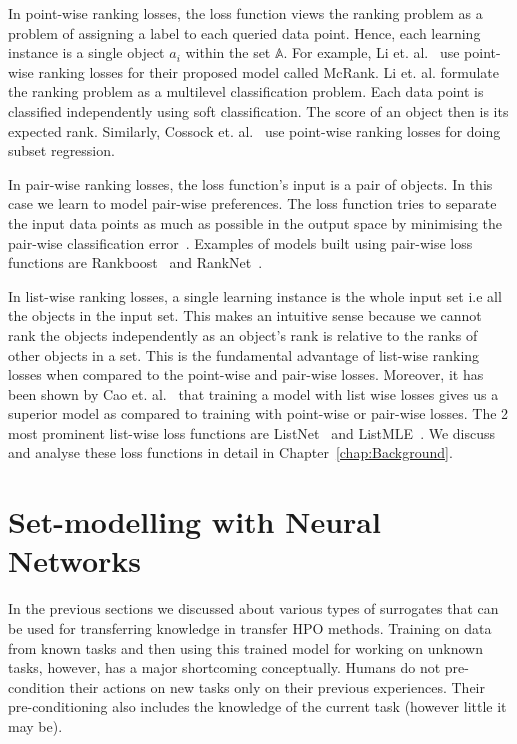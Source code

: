 \documentclass[12pt, twoside, ngerman]{report}
\begin{document}
In point-wise ranking losses,  the loss function views the ranking problem as a problem of assigning a label to each queried data point.
Hence,  each learning instance is a single object $a_i$ within the set $\mathbb{A}$.
For example,  Li et. al.~\cite{McRank} use point-wise ranking losses for their proposed model called McRank.
Li et.  al.  formulate the ranking problem as a multilevel classification problem.
Each data point is classified independently using soft classification.
The score of an object then is its expected rank.
Similarly,  Cossock et.  al.~\cite{subsetregressionpaper} use point-wise ranking losses for doing subset regression. 

In pair-wise ranking losses,  the loss function's input is a pair of objects.
In this case we learn to model pair-wise preferences.
The loss function tries to separate the input data points as much as possible in the output space by minimising the pair-wise classification error~\cite{pairwisepreferencespaper}.
Examples of models built using pair-wise loss functions are Rankboost~\cite{rankboostpaper} and RankNet~\cite{ranknetpaper}.

In list-wise ranking losses,  a single learning instance is the whole input set i.e all the objects in the input set.
This makes an intuitive sense because we cannot rank the objects independently as an object's rank is relative to the ranks of other objects in a set.
This is the fundamental advantage of list-wise ranking losses when compared to the point-wise and pair-wise losses.
Moreover,  it has been shown by Cao et. al.~\cite{listwisebetter} that training a model with list wise losses gives us a superior model as compared to training with point-wise or pair-wise losses.
The 2 most prominent list-wise loss functions are ListNet~\cite{listwisebetter} and ListMLE~\cite{listmlepaper}.
We discuss and analyse these loss functions in detail in Chapter~\ref{chap:Background}.

\section{Set-modelling with Neural Networks}

In the previous sections we discussed about various types of surrogates that can be used for transferring knowledge in transfer HPO methods.
Training on data from known tasks and then using this trained model for working on unknown tasks, however,  has a major shortcoming conceptually.
Humans do not pre-condition their actions on new tasks only on their previous experiences.
Their pre-conditioning also includes the knowledge of the current task (however little it may be).
\end{document}
